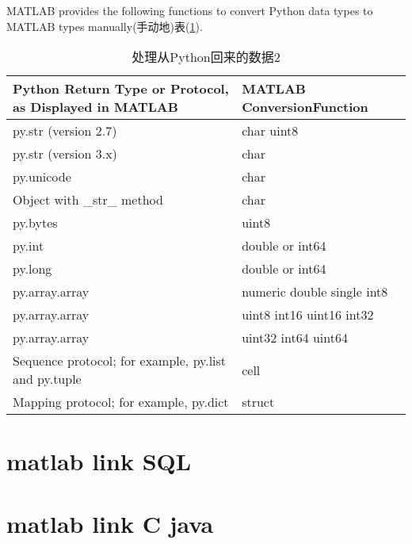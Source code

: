             MATLAB provides the following functions to convert Python data types to MATLAB types manually(手动地)表(\ref{处理从Python回来的数据2}).
            \begin{table}[H]
              \centering
              \caption{处理从Python回来的数据2}
              \label{处理从Python回来的数据2}
              \begin{tabularx}{\textwidth}{l|l}%
              \toprule
              Python Return Type or Protocol, as Displayed in MATLAB& MATLAB ConversionFunction \\
              \midrule
              py.str (version 2.7) & char uint8\\
              py.str (version 3.x) & char\\
              py.unicode & char\\
              Object with \_str\_ method & char\\
              py.bytes & uint8\\
              py.int & double or int64\\
              py.long& double or int64\\
              py.array.array& numeric double single int8\\
              py.array.array& uint8 int16 uint16 int32\\
              py.array.array& uint32 int64 uint64\\
              Sequence protocol; for example, py.list and py.tuple & cell\\
              Mapping protocol; for example, py.dict & struct\\
              \bottomrule
              \end{tabularx}
            \end{table}

\section{matlab link SQL}

\section{matlab link C java }



